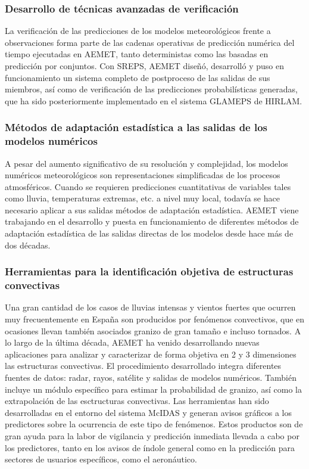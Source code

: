 \documentclass[11pt]{article}
\begin{document}
\subsubsection{Desarrollo de técnicas avanzadas de verificación}
\label{sec-2-5-5}

La verificación de las predicciones de los modelos meteorológicos
frente a observaciones forma parte de las cadenas operativas de
predicción numérica del tiempo ejecutadas en AEMET, tanto
deterministas como las basadas en predicción por conjuntos. Con
SREPS, AEMET diseñó, desarrolló y puso en funcionamiento un
sistema completo de postproceso de las salidas de sus miembros,
así como de verificación de las predicciones probabilísticas
generadas, que ha sido posteriormente implementado en el sistema
GLAMEPS de HIRLAM.
\subsubsection{Métodos de adaptación estadística a las salidas de los modelos numéricos}
\label{sec-2-5-6}

A pesar del aumento significativo de su resolución y complejidad,
los modelos numéricos meteorológicos son representaciones
simplificadas de los procesos atmosféricos. Cuando se requieren
predicciones cuantitativas de variables tales como lluvia,
temperaturas extremas, etc. a nivel muy local, todavía se hace
necesario aplicar a sus salidas métodos de adaptación
estadística. AEMET viene trabajando en el desarrollo y puesta en
funcionamiento de diferentes métodos de adaptación estadística de
las salidas directas de los modelos desde hace más de dos décadas.
\subsubsection{Herramientas para la identificación objetiva de estructuras convectivas}
\label{sec-2-5-7}

Una gran cantidad de los casos de lluvias intensas y vientos
fuertes que ocurren muy frecuentemente en España son producidos
por fenómenos convectivos, que en ocasiones llevan también
asociados granizo de gran tamaño e incluso tornados. A lo largo de
la última década, AEMET ha venido desarrollando nuevas
aplicaciones para analizar y caracterizar de forma objetiva en 2 y
3 dimensiones las estructuras convectivas.  El procedimiento
desarrollado integra diferentes fuentes de datos: radar, rayos,
satélite y salidas de modelos numéricos. También incluye un módulo
específico para estimar la probabilidad de granizo, así como la
extrapolación de las esctructuras convectivas. Las herramientas
han sido desarrolladas en el entorno del sistema McIDAS y generan
avisos gráficos a los predictores sobre la ocurrencia de este tipo
de fenómenos. Estos productos son de gran ayuda para la labor de
vigilancia y predicción inmediata llevada a cabo por los
predictores, tanto en los avisos de índole general como en la
predicción para sectores de usuarios específicos, como el
aeronáutico.
\end{document}
